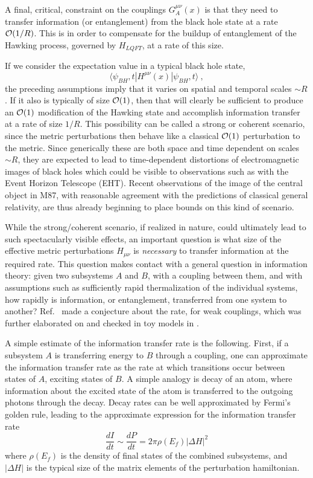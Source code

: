 \documentclass[11pt]{article}
\numberwithin{equation}{section}
\newcommand{\calo}{{\cal O}}
\newcommand{\beq}{\begin{equation}}
\newcommand{\eeq}{\end{equation}}
\begin{document}
A final, critical, constraint on the couplings $G_A^{\mu\nu}(x)$ is that they need to transfer information (or entanglement) from the black hole state at a rate $\calo(1/R)$.  This is in order to compensate for the buildup of entanglement of the Hawking process, governed by $H_{LQFT}$, at a rate of this size. 

If we consider the expectation value in a typical black hole state,
\beq
\langle \psi_{BH},t|H^{\mu\nu}(x)|\psi_{BH},t\rangle\ ,
\eeq
the preceding assumptions imply that it varies on spatial and temporal scales $\sim R$.  If it also is typically of size $\calo(1)$, then that will clearly be sufficient to produce an $\calo(1)$ modification of the Hawking state and accomplish information transfer at a rate of size $1/R$.  This possibility can be called a strong or coherent scenario, since the metric perturbations then behave like a classical $\calo(1)$ perturbation to the metric.  Since generically these are both space and time dependent on scales $\sim R$, they are expected to lead to time-dependent distortions of electromagnetic images of black holes\cite{SGObs,SGAstro,GiPs} which could be visible to observations such as with the Event Horizon Telescope (EHT).  Recent observations of the image of the central object in M87\cite{EHT}, with reasonable agreement with the predictions of classical general relativity, are thus already beginning to place bounds on this kind of scenario.

While the strong/coherent scenario, if realized in nature, could ultimately lead to such spectacularly visible effects, an important question is what size of the effective metric perturbations $H_{\mu\nu}$ is {\it necessary} to transfer information at the required rate.  This question makes contact with a general question in information theory: given two subsystems $A$ and $B$, with a coupling between them, and with assumptions such as sufficiently rapid thermalization of the individual systems, how rapidly is information, or entanglement, transferred from one system to another?  Ref.~\cite{NVU} made a conjecture about the rate, for weak couplings, which was further elaborated on and checked in toy models in \cite{GiRo}.  

A simple estimate of the information transfer rate is the following.  First, if a subsystem $A$ is transferring energy to $B$ through a coupling, one can approximate the information transfer rate as the rate at which transitions occur between states of $A$, exciting states of $B$.  A simple analogy is decay of an atom, where information about the excited state of the atom is transferred to the outgoing photons through the decay.  Decay rates can be well approximated by Fermi's golden rule, leading to the approximate expression for the information transfer rate
\beq\label{inforate}
\frac{dI}{dt}\sim \frac{dP}{dt}=2\pi\rho(E_f) |\Delta H|^2
\eeq
where $\rho(E_f)$ is the density of final states of the combined subsystems, and $|\Delta H|$ is the typical size of the matrix elements of the perturbation hamiltonian.
\end{document}
